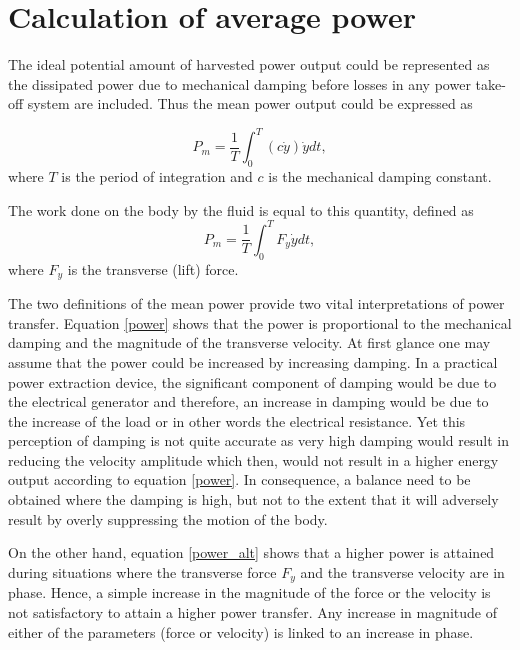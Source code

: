 \section{Calculation of average power}

The ideal potential amount of harvested power output could be represented as the dissipated power due to mechanical damping before losses in any power take-off system are included. Thus the mean power output could be expressed as 


\begin{equation}
\label{eqn:power}
P_{m}=\frac{1}{T}\int_{0}^{T}(c\dot{y})\dot{y} dt,
\end{equation}
where $T$ is the period of integration and $c$ is the mechanical damping constant. 

The work done on the body by the fluid is equal to this quantity, defined as
\begin{equation}
\label{eqn:power_alt}
P_{m}=\frac{1}{T}\int_{0}^{T}F_y\dot{y} dt,
\end{equation}
where $F_y$ is the transverse (lift) force.

The two definitions of the mean power provide two vital interpretations of power transfer. Equation \ref{power} shows that the power is proportional to the mechanical damping and the magnitude of the transverse velocity. At first glance one may assume that the power could be increased by increasing damping. In a practical power extraction device, the significant component of damping would be due to the electrical generator and therefore, an increase in damping would be due to the increase of the load or in other words the electrical resistance. Yet this perception of damping is not quite accurate as very high damping would result in reducing the velocity amplitude which then, would not result in a higher energy output according to equation \ref{power}. In consequence, a balance need to be obtained where the damping is high, but not to the extent that it will adversely result by overly suppressing the motion of the body.  

On the other hand, equation \ref{power_alt} shows that a higher power is attained during situations where the transverse force $F_{y}$ and the transverse velocity are in phase. Hence, a simple increase in the magnitude of the force or the velocity is not satisfactory to attain a higher power transfer. Any increase in magnitude of either of the parameters (force or velocity) is linked to an increase in phase.   




